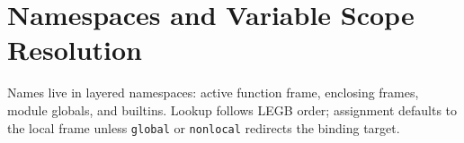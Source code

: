 \section{Namespaces and Variable Scope Resolution}

Names live in layered namespaces: active function frame, enclosing frames, module globals, and builtins. Lookup follows LEGB order; assignment defaults to the local frame unless \texttt{global} or \texttt{nonlocal} redirects the binding target.
